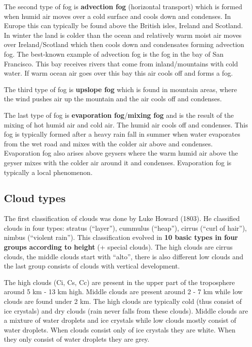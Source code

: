\documentclass[oneside]{book}
\begin{document}
The second type of fog is \textbf{advection fog} (horizontal transport)
which is formed when humid air moves over a cold surface and cools down
and condenses. In Europe this can typically be found above the British
isles, Ireland and Scotland. In winter the land is colder than the ocean
and relatively warm moist air moves over Ireland/Scotland which then
cools down and condensates forming advection fog. The best-known example
of advection fog is the fog in the bay of San Francisco. This bay
receives rivers that come from inland/mountains with cold water. If warm
ocean air goes over this bay this air cools off and forms a fog.

The third type of fog is \textbf{upslope fog} which is found in mountain
areas, where the wind pushes air up the mountain and the air cools off
and condenses.

The last type of fog is \textbf{evaporation fog}/\textbf{mixing fog} and
is the result of the mixing of hot humid air and cold air. The humid air
cools off and condenses. This fog is typically formed after a heavy rain
fall in summer when water evaporates from the wet road and mixes with
the colder air above and condenses. Evaporation fog also arises above
geysers where the warm humid air above the geyser mixes with the colder
air around it and condenses. Evaporation fog is typically a local
phenomenon.

\subsection{Cloud types}\label{cloud-types}

The first classification of clouds was done by Luke Howard (1803). He
classified clouds in four types: stratus (``layer''), cummulus
(``heap''), cirrus (``curl of hair''), nimbus (``violent rain''). This
classification evolved in \textbf{10 basic types in four groups
according to height} (+ special clouds). The high clouds are cirrus
clouds, the middle clouds start with ``alto'', there is also different
low clouds and the last group consists of clouds with vertical
development.

The high clouds (Ci, Cs, Cc) are present in the upper part of the
troposphere around 5 km - 13 km high. Middle clouds are present around 2
- 7 km while low clouds are found under 2 km. The high clouds are
typically cold (thus consist of ice crystals) and dry clouds (rain never
falls from these clouds). Middle clouds are a mixture of water droplets
and ice crystals while low clouds mostly consist of water droplets. When
clouds consist only of ice crystals they are white. When they only
consist of water droplets they are grey.
\end{document}
